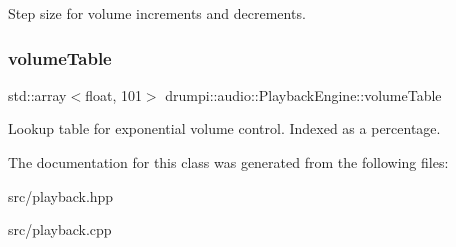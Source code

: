 Step size for volume increments and decrements. \mbox{\label{classdrumpi_1_1audio_1_1PlaybackEngine_ab546a7b63e007c69c7249f867768af0b}} 
\subsubsection{\texorpdfstring{volume\+Table}{volumeTable}}
{\footnotesize\ttfamily std\+::array$<$float, 101$>$ drumpi\+::audio\+::\+Playback\+Engine\+::volume\+Table\hspace{0.3cm}{\ttfamily [private]}}

Lookup table for exponential volume control. Indexed as a percentage. 

The documentation for this class was generated from the following files\+:\begin{DoxyCompactItemize}
\item 
src/playback.\+hpp\item 
src/playback.\+cpp\end{DoxyCompactItemize}
